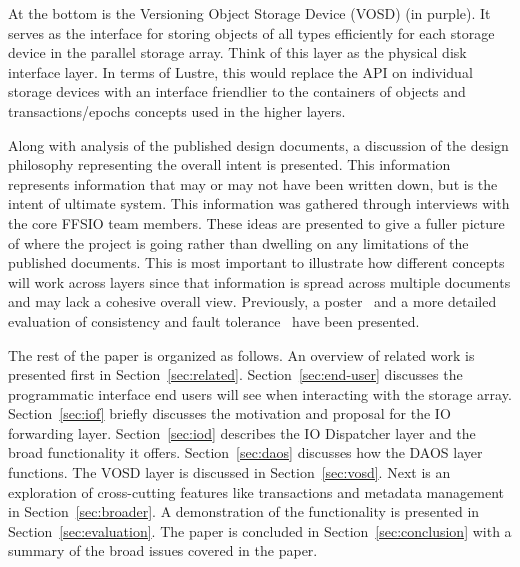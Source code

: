 \documentclass[conference]{IEEEtran} \pdfpagewidth=8.5in
\begin{document}
At the bottom is the Versioning Object Storage Device (VOSD) (in purple).  It
serves as the interface for storing objects of all types efficiently for each
storage device in the parallel storage array. Think of this layer as the
physical disk interface layer. In terms of Lustre, this would replace the API
on individual storage devices with an interface friendlier to the containers of
objects and transactions/epochs concepts used in the higher layers.

Along with analysis of the published design documents, a discussion of the
design philosophy representing the overall intent is presented. This
information represents information that may or may not have been written down,
but is the intent of ultimate system.  This information was gathered through
interviews with the core FFSIO team members. These ideas are presented to give
a fuller picture of where the project is going rather than dwelling on any
limitations of the published documents. This is most important to illustrate
how different concepts will work across layers since that information is spread
across multiple documents and may lack a cohesive overall view. Previously,
a poster~\cite{lofstead:2014:ffsio-poster} and a more detailed evaluation of
consistency and fault tolerance~\cite{lofstead:2014:ffsio-consistency} have
been presented.

The rest of the paper is organized as follows. An overview of related work is
presented first in Section~\ref{sec:related}. Section~\ref{sec:end-user}
discusses the programmatic interface end users will see when interacting with
the storage array.
Section~\ref{sec:iof}
briefly discusses the motivation and proposal for the IO forwarding layer.
Section~\ref{sec:iod} describes the IO Dispatcher layer and the broad
functionality it offers.
Section~\ref{sec:daos} discusses how the DAOS
layer functions.
The VOSD layer is discussed in Section~\ref{sec:vosd}.
Next is an exploration of cross-cutting features like transactions and
metadata management in Section~\ref{sec:broader}.
A demonstration of the functionality is presented in
Section~\ref{sec:evaluation}.
The paper is concluded in
Section~\ref{sec:conclusion} with a summary of the broad issues covered in the
paper.
\end{document}
